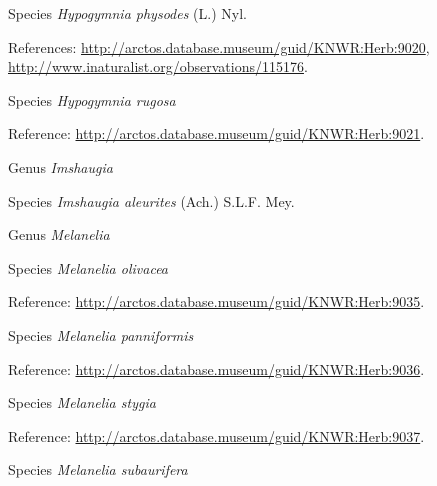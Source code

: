 \documentclass[9pt, article]{memoir}
\begin{document}
\begin{multicols}{2}
\vspace{6pt}\noindent\hspace{36pt}Species \textit{Hypogymnia physodes} (L.) Nyl.


\vspace{6pt}References: 
\url{http://arctos.database.museum/guid/KNWR:Herb:9020}, 
\url{http://www.inaturalist.org/observations/115176}.

\vspace{6pt}\noindent\hspace{36pt}Species \textit{Hypogymnia rugosa}


\vspace{6pt}Reference: 
\url{http://arctos.database.museum/guid/KNWR:Herb:9021}.

\vspace{6pt}\noindent\hspace{30pt}Genus \textit{Imshaugia}


\vspace{6pt}\noindent\hspace{36pt}Species \textit{Imshaugia aleurites} (Ach.) S.L.F. Mey.


\vspace{6pt}\noindent\hspace{30pt}Genus \textit{Melanelia}


\vspace{6pt}\noindent\hspace{36pt}Species \textit{Melanelia olivacea}


\vspace{6pt}Reference: 
\url{http://arctos.database.museum/guid/KNWR:Herb:9035}.

\vspace{6pt}\noindent\hspace{36pt}Species \textit{Melanelia panniformis}


\vspace{6pt}Reference: 
\url{http://arctos.database.museum/guid/KNWR:Herb:9036}.

\vspace{6pt}\noindent\hspace{36pt}Species \textit{Melanelia stygia}


\vspace{6pt}Reference: 
\url{http://arctos.database.museum/guid/KNWR:Herb:9037}.

\vspace{6pt}\noindent\hspace{36pt}Species \textit{Melanelia subaurifera}



\end{multicols}
\end{document}
